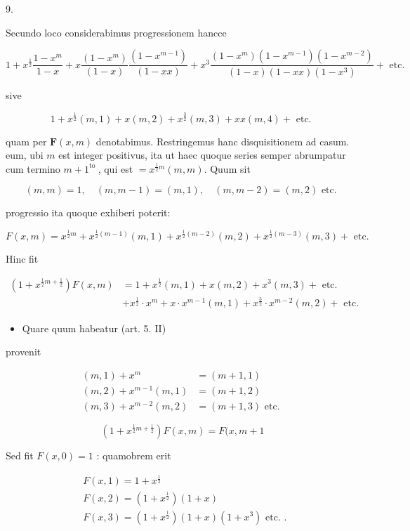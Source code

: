 \documentclass[10pt]{article}
\begin{document}
9.

Secundo loco considerabimus progressionem hancce

\[
1+x^{\frac{1}{2}} \frac{1-x^{m}}{1-x}+x \frac{\left(1-x^{m}\right)}{(1-x)} \frac{\left(1-x^{m-1}\right)}{(1-x x)}+x^{3} \frac{\left(1-x^{m}\right)\left(1-x^{m-1}\right)\left(1-x^{m-2}\right)}{(1-x)(1-x x)\left(1-x^{3}\right)}+\text { etc. }
\]

sive

\[
1+x^{\frac{1}{2}}(m, 1)+x(m, 2)+x^{\frac{3}{2}}(m, 3)+x x(m, 4)+\text { etc. }
\]

quam per \(\boldsymbol{F}(x, m)\) denotabimus. Restringemus hanc disquisitionem ad casum. eum, ubi \(m\) est integer positivus, ita ut haec quoque series semper abrumpatur
cum termino \(m+1^{\text {to }}\), qui est \(=x^{\frac{1}{2} m}(m, m)\). Quum sit

\[
(m, m)=1, \quad(m, m-1)=(m, 1), \quad(m, m-2)=(m, 2) \text { etc. }
\]

progressio ita quoque exhiberi poterit:

\[
F(x, m)=x^{\frac{1}{2} m}+x^{\frac{1}{2}(m-1)}(m, 1)+x^{\frac{1}{2}(m-2)}(m, 2)+x^{\frac{1}{2}(m-3)}(m, 3)+\text { etc. }
\]

Hinc fit

\[
\begin{aligned}
\left(1+x^{\frac{1}{2} m+\frac{1}{2}}\right) F(x, m) & =1+x^{\frac{1}{2}}(m, 1)+x(m, 2)+x^{3}(m, 3)+\text { etc. } \\
& +x^{\frac{1}{2}} \cdot x^{m}+x \cdot x^{m-1}(m, 1)+x^{\frac{3}{2}} \cdot x^{m-2}(m, 2)+\text { etc. }
\end{aligned}
\]

\begin{itemize}
  \item Quare quum habeatur (art. 5. II)
\end{itemize}

provenit

\[
\begin{aligned}
(m, 1)+x^{m} & =(m+1,1) \\
(m, 2)+x^{m-1}(m, 1) & =(m+1,2) \\
(m, 3)+x^{m-2}(m, 2) & =(m+1,3) \text { etc. }
\end{aligned}
\]

\[
\left(1+x^{\frac{1}{2} m+\frac{1}{2}}\right) F(x, m)=F(x, m+1
\]

Sed fit \(F(x, 0)=1\) : quamobrem erit

\[
\begin{aligned}
& F(x, 1)=1+x^{\frac{1}{2}} \\
& F(x, 2)=\left(1+x^{\frac{1}{2}}\right)(1+x) \\
& F(x, 3)=\left(1+x^{\frac{1}{2}}\right)(1+x)\left(1+x^{3}\right) \text { etc. . }
\end{aligned}
\]
\end{document}
